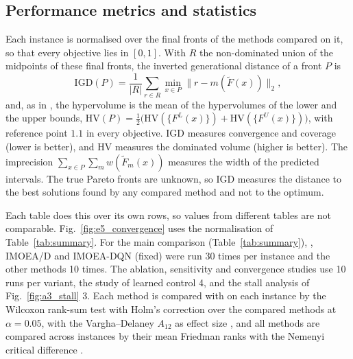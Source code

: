 \subsection{Performance metrics and statistics}
Each instance is normalised over the final fronts of the methods compared on it, so that every objective lies in
$[0, 1]$. With $R$ the non-dominated union of the midpoints of these final fronts, the inverted generational distance of
a front $P$ is
\begin{equation}
\mathrm{IGD}(P) = \frac{1}{|R|} \sum_{r \in R} \min_{x \in P} \lVert r - m(\tilde F(x)) \rVert_2,
\label{eq:igd}
\end{equation}
and, as in \citet{jin2026imoeadqn}, the hypervolume is the mean of the hypervolumes of the lower and the upper bounds,
$\mathrm{HV}(P) = \tfrac{1}{2}\big(\mathrm{HV}(\{F^L(x)\}) + \mathrm{HV}(\{F^U(x)\})\big)$, with reference point $1.1$ in
every objective. IGD measures convergence and coverage (lower is better), and HV measures the dominated volume (higher
is better). The imprecision $\sum_{x \in P} \sum_m w(\tilde F_m(x))$ measures the width of the predicted intervals.
The true Pareto fronts are unknown, so IGD measures the distance to the best solutions found by any compared method
and not to the optimum.

Each table does this over its own rows, so values from different tables are not comparable. Fig.~\ref{fig:e5_convergence}
uses the normalisation of Table~\ref{tab:summary}. For the main comparison (Table~\ref{tab:summary}), \ours{}, IMOEA/D and IMOEA-DQN (fixed)
were run 30 times per instance and the other methods 10 times. The ablation, sensitivity and convergence studies use 10
runs per variant, the study of learned control 4, and the stall analysis of Fig.~\ref{fig:a3_stall} 3. Each method is
compared with \ours{} on each instance by the Wilcoxon rank-sum test with Holm's correction \citep{holm1979} over the
compared methods at $\alpha = 0.05$, with the Vargha--Delaney $A_{12}$ as effect size \citep{vargha2000}, and all
methods are compared across instances by their mean Friedman ranks with the Nemenyi critical difference
\citep{demsar2006}.

